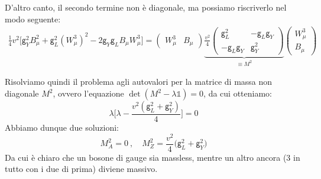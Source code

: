 \documentclass[../main.tex]{subfiles}
\begin{document}
D'altro canto, il secondo termine non è diagonale, ma possiamo riscriverlo nel modo seguente:
\begin{align*}
    \frac{1}{4}v^2 \Big[\mathsf g_Y^2 B_\mu^2 + \mathsf g_L^2 (W_\mu^3)^2 - 2\mathsf g_Y\mathsf g_LB_\mu W_\mu^3\Big] =  \begin{pmatrix} W_\mu^3 & B_\mu \end{pmatrix} 
    \underbrace{
    \frac{v^2}{4}
    \begin{pmatrix}
        \mathsf g_L^2    & -\mathsf g_L\mathsf g_Y   \\
        -\mathsf g_L\mathsf g_Y    & \mathsf g_Y^2
    \end{pmatrix}}_{\equiv M^2} 
    \begin{pmatrix} W_\mu^3 \\ B_\mu \end{pmatrix} 
\end{align*}

Risolviamo quindi il problema agli autovalori per la matrice di massa non diagonale $M^2$, ovvero l'equazione $\det(M^2 - \lambda\mathbb1)=0$, da cui otteniamo:
\[
\lambda\bigg[\lambda - \frac{v^2(\mathsf g_L^2+\mathsf g_Y^2)}{4}\bigg] = 0
\]
Abbiamo dunque due soluzioni:
\begin{equation}
    \boxed{M_A^2 = 0 ~,\quad M_Z^2 = \frac{v^2}{4}\big(\mathsf g_L^2+\mathsf g_Y^2\big)}
    \label{eq:A_Z_bosons_masses}
\end{equation}
Da cui è chiaro che un bosone di gauge sia massless, mentre un altro ancora (3 in tutto con i due di prima) diviene massivo.
\end{document}
